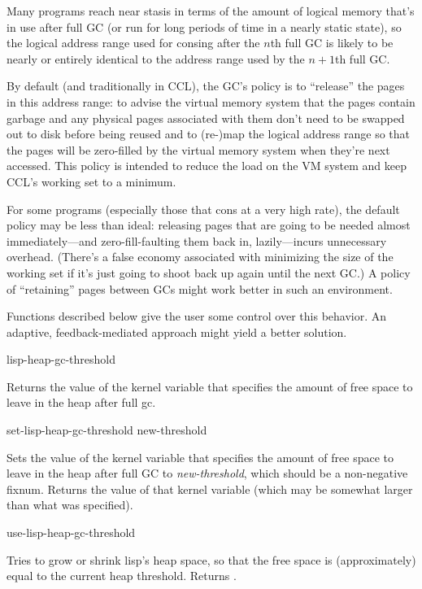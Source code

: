 Many programs reach near stasis in terms of the amount of logical
memory that's in use after full GC (or run for long periods of time in
a nearly static state), so the logical address range used for consing
after the $n$th full GC is likely to be nearly or entirely identical to
the address range used by the $n+1$th full GC.

By default (and traditionally in CCL), the GC's policy is to ``release''
the pages in this address range: to advise the virtual memory system
that the pages contain garbage and any physical pages associated with
them don't need to be swapped out to disk before being reused and to
(re-)map the logical address range so that the pages will be
zero-filled by the virtual memory system when they're next
accessed. This policy is intended to reduce the load on the VM system
and keep CCL's working set to a minimum.

For some programs (especially those that cons at a very high rate),
the default policy may be less than ideal: releasing pages that are
going to be needed almost immediately---and zero-fill-faulting them
back in, lazily---incurs unnecessary overhead. (There's a false
economy associated with minimizing the size of the working set if it's
just going to shoot back up again until the next GC.) A policy of
``retaining'' pages between GCs might work better in such an
environment.

Functions described below give the user some control over this
behavior. An adaptive, feedback-mediated approach might yield a better
solution.

\begin{defun}[Function]
lisp-heap-gc-threshold

Returns the value of the kernel variable that specifies the amount of
free space to leave in the heap after full gc.
\end{defun}

\begin{defun}[Function]
set-lisp-heap-gc-threshold new-threshold

Sets the value of the kernel variable that specifies the amount of
free space to leave in the heap after full GC to {\it new-threshold},
which should be a non-negative fixnum. Returns the value of that
kernel variable (which may be somewhat larger than what was
specified).
\end{defun}

\begin{defun}[Function]
use-lisp-heap-gc-threshold

Tries to grow or shrink lisp's heap space, so that the free space is
(approximately) equal to the current heap threshold. Returns \nil.
\end{defun}

